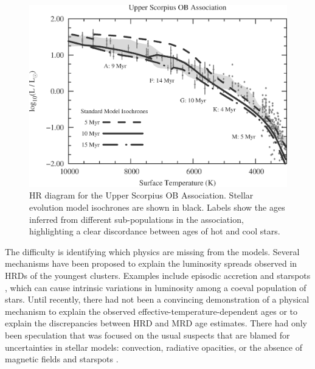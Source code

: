 
\begin{figure}[t]
	\centering
	\includegraphics[width=0.65\columnwidth]{fig/USco_Age_Problems.eps}
	\caption{HR diagram for the Upper Scorpius OB Association. Stellar evolution model isochrones are shown in black. Labels show the ages inferred from different sub-populations in the association, highlighting a clear discordance between ages of hot and cool stars.}
	\label{fig:badhrd}
	\vspace{-0.2in}
\end{figure}

The difficulty is identifying which physics are missing from the models. Several mechanisms have been proposed to explain the luminosity spreads observed in HRDs of the youngest clusters. Examples include episodic accretion \citep{Baraffe2009, Baraffe2010} and starspots \citep{Somers2015b}, which can cause intrinsic variations in luminosity among a coeval population of stars. Until recently, there had not been a convincing demonstration of a physical mechanism to explain the observed effective-temperature-dependent ages or to explain the discrepancies between HRD and MRD age estimates. There had only been speculation that was focused on the usual suspects that are blamed for uncertainties in stellar models: convection, radiative opacities, or the absence of magnetic fields and starspots  \citep{Stassun2014, Soderblom2014, Herczeg2015}. 



